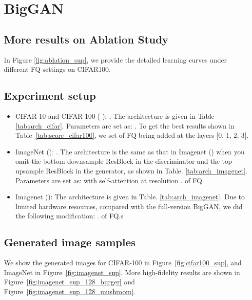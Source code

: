 \documentclass{article}
\begin{document}







\appendix



\section{BigGAN}
\subsection{More results on Ablation Study}
In Figure \ref{fig:ablation_sup}, we provide the detailed learning curves under different FQ settings on CIFAR100.

\subsection{Experiment setup}\label{app:biggan}
\begin{itemize}
    \item CIFAR-10 and CIFAR-100 ( ): . The architecture is given in Table \ref{tab:arch_cifar}. Parameters are set as: . To get the best results shown in Table~\ref{tab:score_cifar100}, we set  of FQ being added at the layers [0, 1, 2, 3]. 
    \item ImageNet (): . The architecture is the same as that in Imagenet () when you omit the bottom downsample ResBlock in the discriminator and the top upsample ResBlock in the generator, as shown in Table. \ref{tab:arch_imagenet}. Parameters are set as:  with self-attention at resolution .  of FQ.
    \item Imagenet (): The architecture is given in Table. \ref{tab:arch_imagenet}. Due to limited hardware resources, compared with the full-version BigGAN, we did the following modification: .  of FQ.s

\end{itemize}




\subsection{Generated image samples}
We show the generated images for CIFAR-100  in Figure~\ref{fig:cifar100_sup}, and ImageNet in Figure~\ref{fig:imagenet_sup}. More high-fidelity results are shown in Figure~\ref{fig:imagenet_sup_128_burger} and Figure~\ref{fig:imagenet_sup_128_mushroom}.
\end{document}
